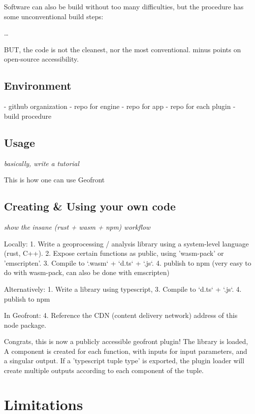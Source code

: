 Software can also be build without too many difficulties, but the procedure has some unconventional build steps: 

\dots

BUT, the code is not the cleanest, nor the most conventional. minus points on open-source accessibility.



\subsection{Environment}%
- github organization 
- repo for engine 
- repo for app 
- repo for each plugin
- build procedure

\subsection{Usage}%

\emph{basically, write a tutorial}

This is how one can use Geofront

\subsection{Creating \& Using your own code}
\emph{show the insane (rust + wasm + npm) workflow}

Locally: 
1. Write a geoprocessing / analysis library using a system-level language (rust, C++).
2. Expose certain functions as public, using 'wasm-pack' or 'emscripten'.
3. Compile to `.wasm` + `d.ts` + `.js`.
4. publish to npm (very easy to do with wasm-pack, can also be done with emscripten)

Alternatively: 
1. Write a library using typescript, 
3. Compile to `d.ts` + `.js`.
4. publish to npm 

In Geofront: 
4. Reference the CDN (content delivery network) address of this node package. 

Congrats, this is now a publicly accessible geofront plugin!
The library is loaded, A component is created for each function, with inputs for input parameters, and a singular output. If a 'typescript tuple type' is exported, the plugin loader will create multiple outputs according to each component of the tuple.

\section{Limitations}%

